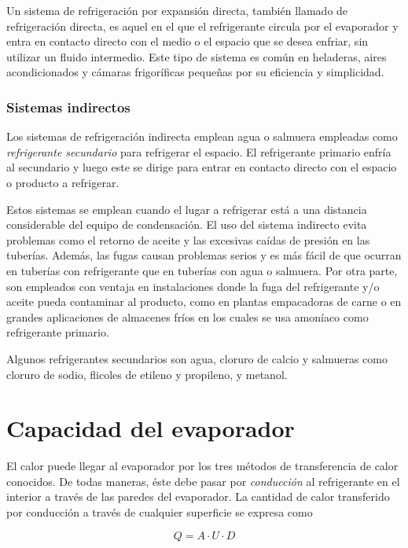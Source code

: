 			Un sistema de refrigeración por expansión directa, también llamado de refrigeración directa, es aquel en el que el refrigerante circula por el evaporador y entra en contacto directo con el medio o el espacio que se desea enfriar, sin utilizar un fluido intermedio. Este tipo de sistema es común en heladeras, aires acondicionados y cámaras frigoríficas pequeñas por su eficiencia y simplicidad.
				
			\subsubsection{Sistemas indirectos}
				
				Los sistemas de refrigeración indirecta emplean agua o salmuera empleadas como \emph{refrigerante secundario} para refrigerar el espacio. El refrigerante primario enfría al secundario y luego este se dirige para entrar en contacto directo con el espacio o producto a refrigerar.
				
				Estos sistemas se emplean cuando el lugar a refrigerar está a una distancia considerable del equipo de condensación. El uso del sistema indirecto evita problemas como el retorno de aceite y las excesivas caídas de presión en las tuberías. Además, las fugas causan problemas serios y es más fácil de que ocurran en tuberías con refrigerante que en tuberías con agua o salmuera. Por otra parte, son empleados con ventaja en instalaciones donde la fuga del refrigerante y/o aceite pueda contaminar al producto, como en plantas empacadoras de carne o en grandes aplicaciones de almacenes fríos en los cuales se usa amoníaco como refrigerante primario.
				
				Algunos refrigerantes secundarios son agua, cloruro de calcio y salmueras como cloruro de sodio, flicoles de etileno y propileno, y metanol.
		
	\section{Capacidad del evaporador}\label{sec:capacidad-evaporador}
	
		El calor puede llegar al evaporador por los tres métodos de transferencia de calor conocidos. De todas maneras, éste debe pasar por \emph{conducción} al refrigerante en el interior a través de las paredes del evaporador. La cantidad de calor transferido por conducción a través de cualquier superficie se expresa como
		
		\begin{equation}\label{eq:calor}
			Q = A \cdot U \cdot D
		\end{equation}
		
